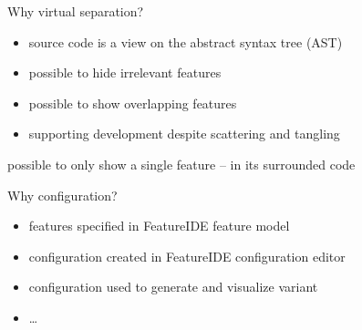 \begin{frame}{\myframetitle}
	\begin{mycolumns}[widths={70},animation=none]
	\mynextcolumn
		\begin{example}{Why virtual separation?}
			\begin{itemize}
				\item source code is a view on the abstract syntax tree (AST)
				\item possible to hide irrelevant features
				\item possible to show overlapping features
				\item supporting development despite scattering and tangling
			\end{itemize}
		\end{example}
	\end{mycolumns}
\end{frame}

\begin{frame}{\myframetitle}
	\begin{example}{}\centering
		possible to only show a single feature -- in its surrounded code
	\end{example}
\end{frame}

\begin{frame}{\myframetitle}
	\begin{mycolumns}[widths={45},animation=none]
		\begin{example}{Why configuration?}
			\begin{itemize}
				\item features specified in FeatureIDE feature model
				\item configuration created in FeatureIDE configuration editor
				\item configuration used to generate and visualize variant
				\item \ldots
			\end{itemize}
		\end{example}
	\mynextcolumn
	\end{mycolumns}
\end{frame}

